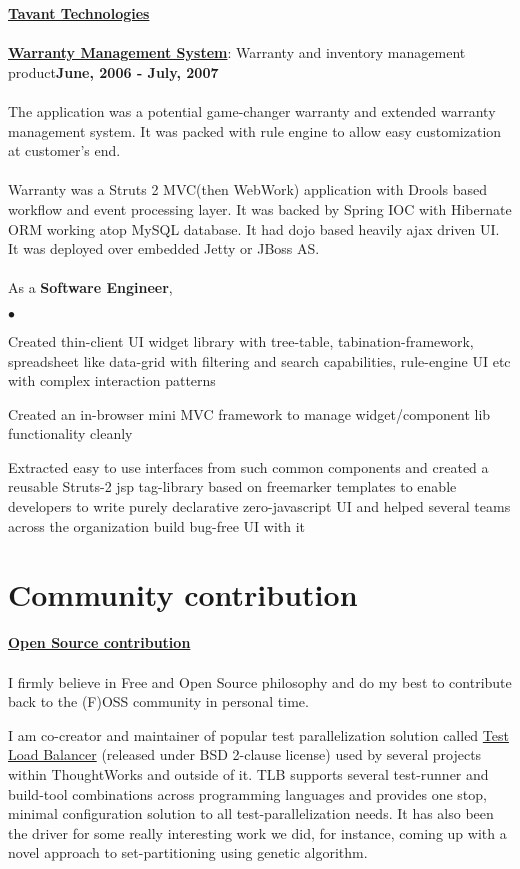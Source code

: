 \documentclass[margin,line]{res}
\newenvironment{list2}{
  \begin{list}{$\bullet$}{%
      \setlength{\itemsep}{0in}
      \setlength{\parsep}{0in} \setlength{\parskip}{0in}
      \setlength{\topsep}{0in} \setlength{\partopsep}{0in} 
      \setlength{\leftmargin}{0.2in}}}{\end{list}}
\begin{document}
\begin{resume}
{\underline {\bf Tavant Technologies}}\\
\\
\href{http://www.tavant.com/warranty-management}{\bf Warranty Management System}: Warranty and inventory management product\hfill {\bf June, 2006 - July, 2007}\\
\vspace{-.2cm}\\
The application was a potential game-changer warranty and extended warranty management system. It was packed with rule engine to allow easy customization at customer's end.\\
\\
Warranty was a Struts 2 MVC(then WebWork) application with Drools based workflow and event processing layer. It was backed by Spring IOC with Hibernate ORM working atop MySQL database. It had dojo based heavily ajax driven UI. It was deployed over embedded Jetty or JBoss AS.\\
\\
As a {\bf Software Engineer},
\begin{list2}
\item Created thin-client UI widget library with tree-table, tabination-framework, spreadsheet like data-grid with filtering and search capabilities, rule-engine UI etc with complex interaction patterns
\item Created an in-browser mini MVC framework to manage widget/component lib functionality cleanly
\item Extracted easy to use interfaces from such common components and created a reusable Struts-2 jsp tag-library based on freemarker templates to enable developers to write purely declarative zero-javascript UI and helped several teams across the organization build bug-free UI with it
\end{list2}

\section{\sc Community contribution}
        {\underline {\bf Open Source contribution}}\\
        \vspace{-.2cm}\\
        I firmly believe in Free and Open Source philosophy and do my best to contribute back to the (F)OSS community in personal time.

        I am co-creator and maintainer of popular test parallelization solution called \href{http://test-load-balancer.github.com}{Test Load Balancer} (released under BSD 2-clause license) used by several projects within ThoughtWorks and outside of it. 
        TLB supports several test-runner and build-tool combinations across programming languages and provides one stop, minimal configuration solution to all test-parallelization needs. 
        It has also been the driver for some really interesting work we did, for instance, coming up with a novel approach to set-partitioning using genetic algorithm.


\end{resume}
\end{document}
